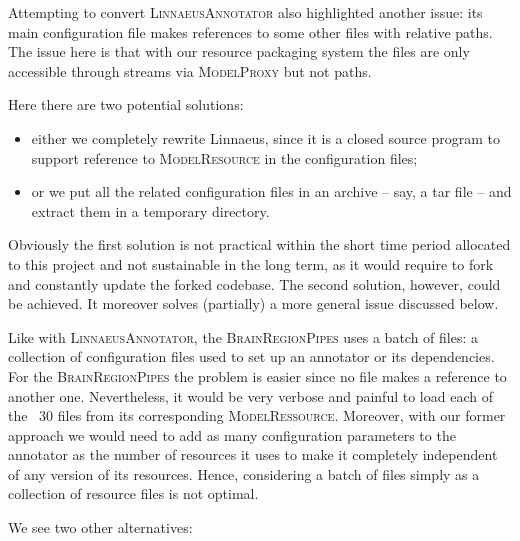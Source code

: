 \documentclass{article}
\newcommand{\id}[1]{\mbox{\textsc{#1}}}
\begin{document}
Attempting to convert \id{LinnaeusAnnotator} also highlighted another issue: its main configuration file makes references to some other files with relative paths. The issue here is that with our resource packaging system the files are only accessible through streams via \id{ModelProxy} but not paths.

Here there are two potential solutions:

\begin{itemize}

\item either we completely rewrite Linnaeus, since it is a closed source program to support reference to \id{ModelResource} in the configuration files;

\item or we put all the related configuration files in an archive -- say, a tar file -- and extract them in a temporary directory.

\end{itemize}

Obviously the first solution is not practical within the short time period allocated to this project and not sustainable in the long term, as it would require to fork and constantly update the forked codebase. The second solution, however, could be achieved. It moreover solves (partially) a more general issue discussed below.

Like with \id{LinnaeusAnnotator}, the \id{BrainRegionPipes} uses a batch of files: a collection of configuration files used to set up an annotator or its dependencies. For the \id{BrainRegionPipes} the problem is easier since no file makes a reference to another one. Nevertheless, it would be very verbose and painful to load each of the ~30 files from its corresponding \id{ModelRessource}. Moreover, with our former approach we would need to add as many configuration parameters to the annotator as the number of resources it uses to make it completely independent of any version of its resources. Hence, considering a batch of files simply as a collection of resource files is not optimal.

We see two other alternatives:
\end{document}
